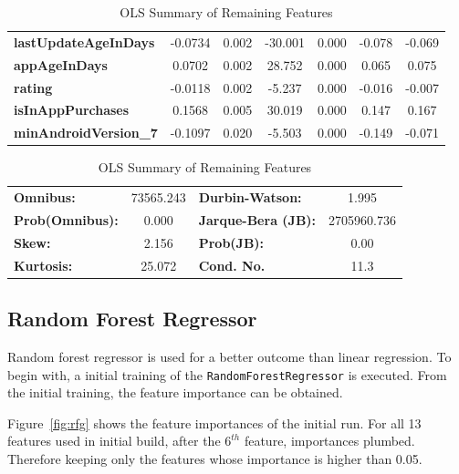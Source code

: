 \begin{table}
\begin{center}
\begin{tabular}{lcccccc}
        \textbf{lastUpdateAgeInDays}  &      -0.0734  &        0.002     &   -30.001  &         0.000        &       -0.078    &       -0.069     \\
        \textbf{appAgeInDays}         &       0.0702  &        0.002     &    28.752  &         0.000        &        0.065    &        0.075     \\
        \textbf{rating}               &      -0.0118  &        0.002     &    -5.237  &         0.000        &       -0.016    &       -0.007     \\
        \textbf{isInAppPurchases}     &       0.1568  &        0.005     &    30.019  &         0.000        &        0.147    &        0.167     \\
        \textbf{minAndroidVersion\_7} &      -0.1097  &        0.020     &    -5.503  &         0.000        &       -0.149    &       -0.071     \\
        \bottomrule
        \end{tabular}
        \end{center}
        \begin{tabular}{lclc}
        \textbf{Omnibus:}       & 73565.243 & \textbf{  Durbin-Watson:     } &      1.995   \\
        \textbf{Prob(Omnibus):} &    0.000  & \textbf{  Jarque-Bera (JB):  } & 2705960.736  \\
        \textbf{Skew:}          &    2.156  & \textbf{  Prob(JB):          } &       0.00   \\
        \textbf{Kurtosis:}      &   25.072  & \textbf{  Cond. No.          } &       11.3   \\
        \bottomrule
        \end{tabular}
        
    \caption{OLS Summary of Remaining Features}
    \label{tab:ols-2}
\end{table}

\subsection{Random Forest Regressor}

Random forest regressor is used for a better outcome than linear regression. To begin with, a initial training of the \texttt{RandomForestRegressor} is executed. From the initial training, the feature importance can be obtained.

Figure~\ref{fig:rfg} shows the feature importances of the initial run. For all 13 features used in initial build, after the $6^{th}$ feature, importances plumbed. Therefore keeping only the features whose importance is higher than 0.05. 

